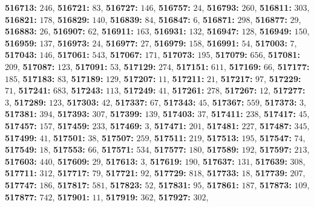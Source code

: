 \textsf{\bfseries 516713:} $246$, \textsf{\bfseries 516721:} $83$, \textsf{\bfseries 516727:} $146$, \textsf{\bfseries 516757:} $24$, \textsf{\bfseries 516793:} $260$, \textsf{\bfseries 516811:} $303$, \textsf{\bfseries 516821:} $178$, \textsf{\bfseries 516829:} $140$, \textsf{\bfseries 516839:} $84$, \textsf{\bfseries 516847:} $6$, \textsf{\bfseries 516871:} $298$, \textsf{\bfseries 516877:} $29$, \textsf{\bfseries 516883:} $26$, \textsf{\bfseries 516907:} $62$, \textsf{\bfseries 516911:} $163$, \textsf{\bfseries 516931:} $132$, \textsf{\bfseries 516947:} $128$, \textsf{\bfseries 516949:} $150$, \textsf{\bfseries 516959:} $137$, \textsf{\bfseries 516973:} $24$, \textsf{\bfseries 516977:} $27$, \textsf{\bfseries 516979:} $158$, \textsf{\bfseries 516991:} $54$, \textsf{\bfseries 517003:} $7$, \textsf{\bfseries 517043:} $146$, \textsf{\bfseries 517061:} $543$, \textsf{\bfseries 517067:} $171$, \textsf{\bfseries 517073:} $195$, \textsf{\bfseries 517079:} $656$, \textsf{\bfseries 517081:} $209$, \textsf{\bfseries 517087:} $123$, \textsf{\bfseries 517091:} $53$, \textsf{\bfseries 517129:} $274$, \textsf{\bfseries 517151:} $611$, \textsf{\bfseries 517169:} $66$, \textsf{\bfseries 517177:} $185$, \textsf{\bfseries 517183:} $83$, \textsf{\bfseries 517189:} $129$, \textsf{\bfseries 517207:} $11$, \textsf{\bfseries 517211:} $21$, \textsf{\bfseries 517217:} $97$, \textsf{\bfseries 517229:} $71$, \textsf{\bfseries 517241:} $683$, \textsf{\bfseries 517243:} $113$, \textsf{\bfseries 517249:} $41$, \textsf{\bfseries 517261:} $278$, \textsf{\bfseries 517267:} $12$, \textsf{\bfseries 517277:} $3$, \textsf{\bfseries 517289:} $123$, \textsf{\bfseries 517303:} $42$, \textsf{\bfseries 517337:} $67$, \textsf{\bfseries 517343:} $45$, \textsf{\bfseries 517367:} $559$, \textsf{\bfseries 517373:} $3$, \textsf{\bfseries 517381:} $394$, \textsf{\bfseries 517393:} $307$, \textsf{\bfseries 517399:} $139$, \textsf{\bfseries 517403:} $37$, \textsf{\bfseries 517411:} $238$, \textsf{\bfseries 517417:} $45$, \textsf{\bfseries 517457:} $157$, \textsf{\bfseries 517459:} $233$, \textsf{\bfseries 517469:} $3$, \textsf{\bfseries 517471:} $201$, \textsf{\bfseries 517481:} $227$, \textsf{\bfseries 517487:} $345$, \textsf{\bfseries 517499:} $41$, \textsf{\bfseries 517501:} $38$, \textsf{\bfseries 517507:} $259$, \textsf{\bfseries 517511:} $219$, \textsf{\bfseries 517513:} $195$, \textsf{\bfseries 517547:} $74$, \textsf{\bfseries 517549:} $18$, \textsf{\bfseries 517553:} $66$, \textsf{\bfseries 517571:} $534$, \textsf{\bfseries 517577:} $180$, \textsf{\bfseries 517589:} $192$, \textsf{\bfseries 517597:} $213$, \textsf{\bfseries 517603:} $440$, \textsf{\bfseries 517609:} $29$, \textsf{\bfseries 517613:} $3$, \textsf{\bfseries 517619:} $190$, \textsf{\bfseries 517637:} $131$, \textsf{\bfseries 517639:} $308$, \textsf{\bfseries 517711:} $312$, \textsf{\bfseries 517717:} $79$, \textsf{\bfseries 517721:} $92$, \textsf{\bfseries 517729:} $818$, \textsf{\bfseries 517733:} $18$, \textsf{\bfseries 517739:} $207$, \textsf{\bfseries 517747:} $186$, \textsf{\bfseries 517817:} $581$, \textsf{\bfseries 517823:} $52$, \textsf{\bfseries 517831:} $95$, \textsf{\bfseries 517861:} $187$, \textsf{\bfseries 517873:} $109$, \textsf{\bfseries 517877:} $742$, \textsf{\bfseries 517901:} $11$, \textsf{\bfseries 517919:} $362$, \textsf{\bfseries 517927:} $302$, 
